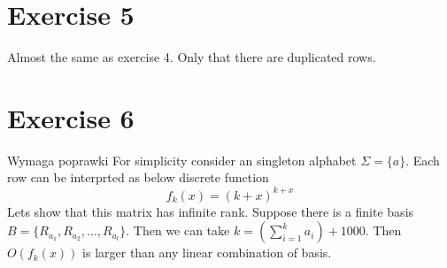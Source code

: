 \documentclass{article}
\begin{document}
\section*{Exercise 5}
Almost the same as exercise 4. Only that there are duplicated rows.

\section*{Exercise 6}
Wymaga poprawki
For simplicity consider an singleton alphabet $\Sigma = \{a \}$.
Each row can be interprted as below discrete function
\[ f_k(x) = (k+x)^{k+x}\] 
Lets show that this matrix has infinite rank.
Suppose there is a finite basis $B = \{ R_{a_1}, R_{a_2}, \ldots, R_{a_l} \}$.
Then we can take $k = (\sum_{i=1}^k a_i) + 1000$. Then $O(f_k(x))$ is larger than any linear combination of basis.
\end{document}
